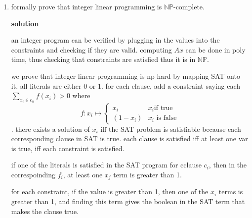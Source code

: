 \documentclass{article}
\begin{document}
\begin{enumerate}
    $\mathcal L = \{\langle M, x, 1^t\rangle | \textrm{M is a non-determinisitic TM
     that runs in t steps and accepts $x$}\}$ is $\mathbb{NP}$-complete.

    \textbf{solution}

    we will map SAT onto this language, and we will provide a certificate that runs in poly time. 

    there exists a way to encode boolean sat problems in unary. convert sat into binary , then conver the binary into unary. \(M_{sat}\), the normal sat solver, will take these unary strings and outputs accept if satisfiable. this means that SAT is reducable to a subproblem in \(\mathcal{L}\).

    a certificate exists by just running M on a proposed string. since the machine \(M\) runs in polynomial time to the size of the input, and the length of the input is O(the size of the input), M will verify the input in polynomial time.

    therefore the language is \(\mathbb{NP}\)-complete





    \item formally prove that integer linear programming is \(\mathbb{NP}\)-complete. 
    
    
    
    \textbf{solution}
    
    an integer program can be verified by plugging in the values into the constraints and checking if they are valid. computing \(Ax\) can be done in poly time, thus checking that constraints are satisfied  thus it is in \(\mathbb{NP}\). 

    we prove that integer linear programming is np hard by mapping SAT onto it. all literals are either 0 or 1. for each clause, add a constraint saying each \(\sum_{x_i\in c_n}^{}f(x_i)>0\) where \begin{equation}
        f:x_{i}\mapsto\begin{cases}
            x_i &x_i \text{if true}\\
            (1-x_i) & x_i\text{ is false}
        \end{cases}
    \end{equation}. there exists a solution of \(x_i\) iff the SAT problem is satisfiable because each corresponding clause in SAT is true. each clause is satisfied iff at least one var is true, iff each constraint is satisfied.

    if one of the literals is satisfied in the SAT program for cclause \(c_i\), then in the correspoinding \(f_i\), at least one \(x_j\) term is greater than 1. 

    for each constraint, if the value is greater than 1, then one of the \(x_i\) terms is greater than 1, and finding this term gives the boolean in the SAT term that makes the clause true.



        
    
    
    
\end{enumerate}
\end{document}
